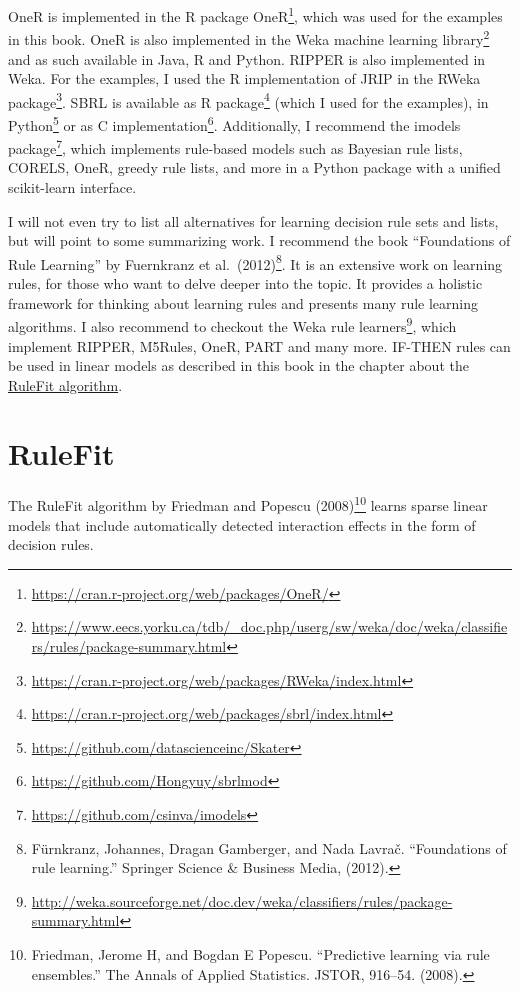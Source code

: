 \documentclass[
  11pt,
]{scrbook}
\renewcommand{\href}[2]{#2\footnote{\url{#1}}}
\begin{document}
OneR is implemented in the \href{https://cran.r-project.org/web/packages/OneR/}{R package OneR}, which was used for the examples in this book.
OneR is also implemented in the \href{https://www.eecs.yorku.ca/tdb/_doc.php/userg/sw/weka/doc/weka/classifiers/rules/package-summary.html}{Weka machine learning library} and as such available in Java, R and Python.
RIPPER is also implemented in Weka. For the examples, I used the R implementation of JRIP in the \href{https://cran.r-project.org/web/packages/RWeka/index.html}{RWeka package}.
SBRL is available as \href{https://cran.r-project.org/web/packages/sbrl/index.html}{R package} (which I used for the examples), in \href{https://github.com/datascienceinc/Skater}{Python} or as \href{https://github.com/Hongyuy/sbrlmod}{C implementation}.
Additionally, I recommend the \href{https://github.com/csinva/imodels}{imodels package}, which implements rule-based models such as Bayesian rule lists, CORELS, OneR, greedy rule lists, and more in a Python package with a unified scikit-learn interface.

I will not even try to list all alternatives for learning decision rule sets and lists, but will point to some summarizing work.
I recommend the book ``Foundations of Rule Learning'' by Fuernkranz et al.~(2012)\footnote{Fürnkranz, Johannes, Dragan Gamberger, and Nada Lavrač. ``Foundations of rule learning.'' Springer Science \& Business Media, (2012).}.
It is an extensive work on learning rules, for those who want to delve deeper into the topic.
It provides a holistic framework for thinking about learning rules and presents many rule learning algorithms.
I also recommend to checkout the \href{http://weka.sourceforge.net/doc.dev/weka/classifiers/rules/package-summary.html}{Weka rule learners}, which implement RIPPER, M5Rules, OneR, PART and many more.
IF-THEN rules can be used in linear models as described in this book in the chapter about the \protect\hyperlink{rulefit}{RuleFit algorithm}.

\newpage

\hypertarget{rulefit}{%
\section{RuleFit}\label{rulefit}}

The RuleFit algorithm by Friedman and Popescu (2008)\footnote{Friedman, Jerome H, and Bogdan E Popescu. ``Predictive learning via rule ensembles.'' The Annals of Applied Statistics. JSTOR, 916--54. (2008).} learns sparse linear models that include automatically detected interaction effects in the form of decision rules.
\end{document}
